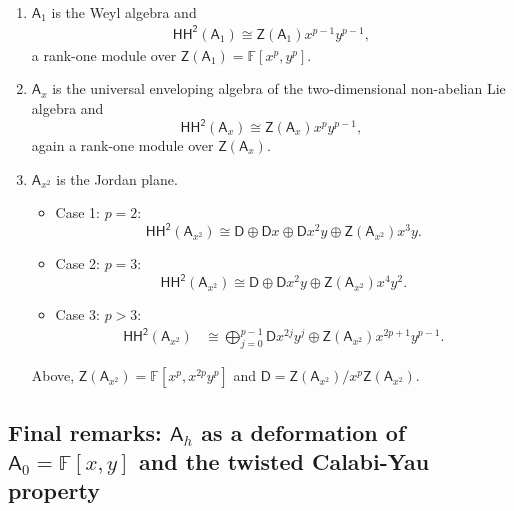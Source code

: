 \documentclass{commat}
\newcommand{\FF}{\mathbb{F}}
\newcommand{\A}{\mathsf{A}}
\newcommand{\D}{\mathsf{D}}
\begin{document}
\begin{example}\hfill\\
	\begin{enumerate}
		\item $\A_1$ is the Weyl algebra and
		\begin{align*}
			\mathsf{HH^2}(\A_1) \cong \mathsf{Z}(\A_1) x^{p-1}y^{p-1},
		\end{align*}
		a rank-one module over $\mathsf{Z}(\A_1)=\FF[x^p, y^p]$. 
		\item $\A_x$ is the universal enveloping algebra of the two-dimensional non-abelian Lie algebra and
		\begin{equation*}
			\mathsf{HH^2}(\A_x) \cong  \mathsf{Z}(\A_x)x^{p}y^{p-1},
		\end{equation*}
		again a rank-one module over $\mathsf{Z}(\A_x)$.
		\item $\A_{x^2}$ is the Jordan plane.
		\begin{itemize}
			\item Case 1: $p=2$:
			\begin{equation*}
				\mathsf{HH^2}(\A_{x^2}) \cong \D \oplus \D x\oplus \D x^2y\oplus \mathsf{Z}(\A_{x^2})x^3y.
			\end{equation*}
			\item Case 2: $p=3$:
			\begin{equation*}
				\mathsf{HH^2}(\A_{x^2}) \cong \D \oplus \D x^{2}y \oplus \mathsf{Z}(\A_{x^2})x^{4}y^{2}.
			\end{equation*}
			\item Case 3: $p>3$:
			\begin{align*}
				\mathsf{HH^2}(\A_{x^2}) &\cong \bigoplus_{j=0}^{p-1} \D x^{2j}y^j \oplus \mathsf{Z}(\A_{x^2})x^{2p+1}y^{p-1}.
			\end{align*}
		\end{itemize}
		
		Above, $\mathsf{Z}(\A_{x^2})=\FF[x^p, x^{2p}y^p]$ and $\D=\mathsf{Z}(\A_{x^2})/x^p\mathsf{Z}(\A_{x^2})$.
	\end{enumerate}
	
\end{example}

\subsection{Final remarks: \texorpdfstring{$\A_h$}{Ah} as a deformation of \texorpdfstring{$\A_0=\FF[x,y]$}{A0=F[x,y]} and the twisted Calabi-Yau property}\label{SS:hh:cy}
\end{document}
